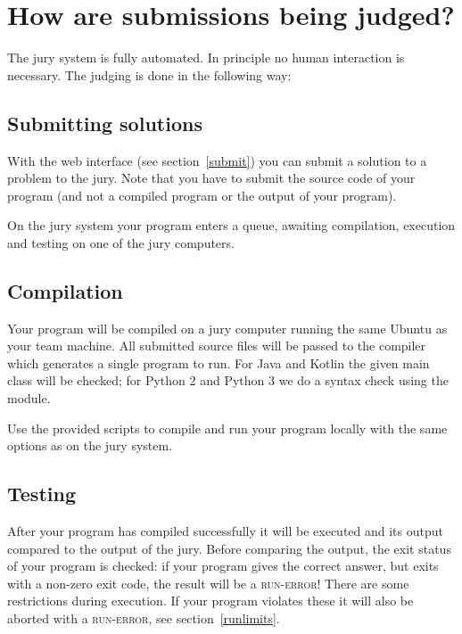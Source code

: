 \section{How are submissions being judged?}\label{howjudged}

The \DOMjudge jury system is fully automated. In principle no human
interaction is necessary. The judging is done in the following way:

\subsection{Submitting solutions}

With%
the web interface (see section~\ref{submit}) you can submit a solution
to a problem to the jury. Note that you have to submit the source code
of your program (and not a compiled program or the output of your
program).

On the jury system your program enters a queue, awaiting compilation,
execution and testing on one of the jury computers.

\subsection{Compilation}

Your program will be compiled on a jury computer running the same Ubuntu as
your team machine.
All submitted source files will be passed to the compiler which
generates a single program to run. For Java and Kotlin the given
main class will be checked; for Python 2 and Python 3 we do a
syntax check using the  module.

Use the provided scripts to compile and run your program locally with
the same options as on the jury system.

\subsection{Testing}

After your program has compiled successfully it will be executed and
its output compared to the output of the jury. Before comparing the
output, the exit status of your program is checked: if your program
gives the correct answer, but exits with a non-zero exit code, the
result will be a \textsc{run-error}! There are some restrictions during
execution. If your program violates these it will also be aborted
with a \textsc{run-error}, see section~\ref{runlimits}.

